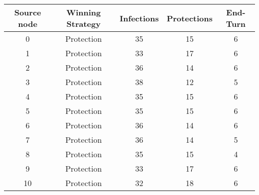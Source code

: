 \documentclass[results.tex]{subfiles}
\begin{document}
    \begin{center}
        \begin{tabular}{| c || c | c | c | c |}
            \hline
            {\bfseries Source node} & {\bfseries Winning Strategy} & {\bfseries Infections} & {\bfseries Protections}
            & {\bfseries End-Turn}
            \\  %
            \hline\hline
            0                       & Protection                   & 35                     & 15                      & 6                    \\
            \hline
            1                       & Protection                   & 33                     & 17                      & 6                    \\
            \hline
            2                       & Protection                   & 36                     & 14                      & 6                    \\
            \hline
            3                       & Protection                   & 38                     & 12                      & 5                    \\
            \hline
            4                       & Protection                   & 35                     & 15                      & 6                    \\
            \hline
            5                       & Protection                   & 35                     & 15                      & 6                    \\
            \hline
            6                       & Protection                   & 36                     & 14                      & 6                    \\
            \hline
            7                       & Protection                   & 36                     & 14                      & 5                    \\
            \hline
            8                       & Protection                   & 35                     & 15                      & 4                    \\
            \hline
            9                       & Protection                   & 33                     & 17                      & 6                    \\
            \hline
            10                      & Protection                   & 32                     & 18                      & 6                    \\

\end{tabular}
\end{center}
\end{document}
